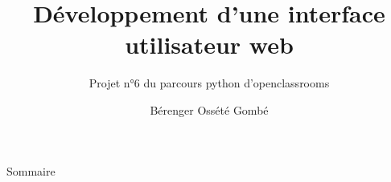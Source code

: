 \documentclass{beamer}
\title{Développement d'une interface utilisateur web}
\subtitle{Projet n°6 du parcours python d'openclassrooms}
\author{Bérenger Ossété Gombé}
\begin{document}
\begin{frame}
  \titlepage
\end{frame}

\begin{frame}{Sommaire}
  \tableofcontents
\end{frame}






\end{document}
